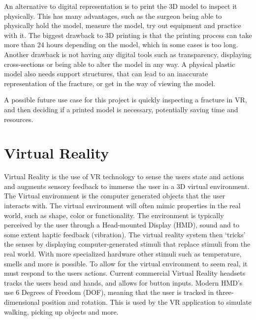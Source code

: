 \documentclass[a4paper]{report}
\begin{document}
An alternative to digital representation is to print the 3D model to inspect it physically\cite{mishra_virtual_2019}. This has many advantages, such as the surgeon being able to physically hold the model, measure the model, try out equipment and practice with it.
The biggest drawback to 3D printing is that the printing process can take more than 24 hours depending on the model, which in some cases is too long. Another drawback is not having any digital tools such as transparency, displaying cross-sections or being able to alter the model in any way. A physical plastic model also needs support structures, that can lead to an inaccurate representation of the fracture, or get in the way of viewing the model.

A possible future use case for this project is quickly inspecting a fracture in VR, and then deciding if a printed model is necessary, potentially saving time and resources.


\section{Virtual Reality}
Virtual Reality is the use of VR technology to sense the users state and actions and augments sensory feedback to immerse the user in a 3D virtual environment\cite{mihelj_virtual_2014}.
The Virtual environment is the computer generated objects that the user interacts with. The virtual environment will often mimic properties in the real world, such as shape, color or functionality.
The environment is typically perceived by the user through a Head-mounted Display (HMD), sound and to some extent haptic feedback (vibration). The virtual reality system then ‘tricks’ the senses by displaying computer-generated stimuli that replace stimuli from the real world. With more specialized hardware other stimuli such as temperature, smells and more is possible\cite{noauthor_feelreal_nodate}.
To allow for the virtual environment to seem real, it must respond to the users actions. Current commercial Virtual Reality headsets tracks the users head and hands, and allows for button inputs\cite{noauthor_oculus_nodate}. Modern HMD's use 6 Degrees of Freedom (DOF), meaning that the user is tracked in three-dimensional position and rotation\cite{lang_introduction_2013}. This is used by the VR application to simulate walking, picking up objects and more.
\end{document}
